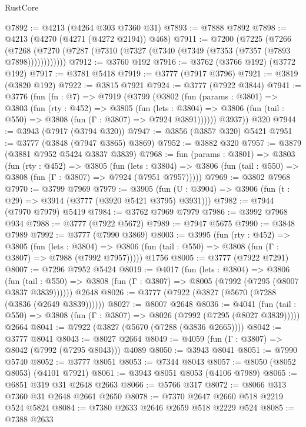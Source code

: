 \begin{lexlean}{RustCore}
\begin{coremodule}
@7892 := @4213 (@4264 @303 @7360 @31)
@7893 := @7888 @7892
@7898 := @4213 (@4270 (@4271 (@4272 @2194)) @468)
@7911 := @7200
    (@7225
      (@7266 (@7268 (@7270 (@7287 (@7310 (@7327 (@7340 (@7349 (@7353 (@7357 (@7893 @7898))))))))))))
@7912 := @3760 @192
@7916 := @3762 (@3766 @192) (@3772 @192)
@7917 := @3781 @5418
@7919 := @3777 (@7917 @3796)
@7921 := @3819 (@3820 @192)
@7922 := @3815 @7921
@7924 := @3777 (@7922 @3844)
@7941 := @3776
    (fun (fn : @7) =>
    @7919
      (@3799
        (@3802
          (fun (params : @3801) =>
          @3803
            (fun (rty : @452) =>
            @3805
              (fun (lets : @3804) =>
              @3806 (fun (tail : @550) => @3808 (fun (Γ : @3807) => @7924 @3891))))))
        @3937))
    @320
@7944 := @3943 (@7917 (@3794 @320))
@7947 := @3856 (@3857 @320) @5421
@7951 := @3777 (@3848 (@7947 @3865) @3869)
@7952 := @3882 @320
@7957 := @3879 (@3881 @7952 @5424 @3837 @3839)
@7968 := fun (params : @3801) =>
  @3803
    (fun (rty : @452) =>
    @3805
      (fun (lets : @3804) =>
      @3806 (fun (tail : @550) => @3808 (fun (Γ : @3807) => @7924 (@7951 @7957)))))
@7969 := @3802 @7968
@7970 := @3799 @7969
@7979 := @3905 (fun (U : @3904) => @3906 (fun (t : @29) => @3914 (@3777 (@3920 @5421 @3795) @3931)))
@7982 := @7944 (@7970 @7979) @5419
@7984 := @3762 @7969 @7979
@7986 := @3992 @7968 @934
@7988 := @3777 (@7922 @5672)
@7989 := @7947 @5675
@7990 := @3848 @7989
@7992 := @3777 (@7990 @3869)
@8003 := @3995
    (fun (rty : @452) =>
    @3805
      (fun (lets : @3804) =>
      @3806 (fun (tail : @550) => @3808 (fun (Γ : @3807) => @7988 (@7992 @7957)))))
    @1756
@8005 := @3777 (@7922 @7291)
@8007 := @7296 @7952 @5424
@8019 := @4017
    (fun (lets : @3804) =>
    @3806
      (fun (tail : @550) => @3808 (fun (Γ : @3807) => @8005 (@7992 (@7295 (@8007 @3837 @3839))))))
    @2648
@8026 := @3777 (@7922 (@3827 (@5670 (@7288 (@3836 (@2649 @3839))))))
@8027 := @8007 @2648
@8036 := @4041
    (fun (tail : @550) => @3808 (fun (Γ : @3807) => @8026 (@7992 (@7295 (@8027 @3839)))))
    @2664
@8041 := @7922 (@3827 (@5670 (@7288 (@3836 @2665))))
@8042 := @3777 @8041
@8043 := @8027 @2664
@8049 := @4059 (fun (Γ : @3807) => @8042 (@7992 (@7295 @8043))) @4089
@8050 := @3943 @8041
@8051 := @7990 @5740
@8052 := @3777 @8051
@8053 := @7344 @8043
@8057 := @8050 (@8052 @8053) (@4101 @7921)
@8061 := @3943 @8051 @8053 (@4106 @7989)
@8065 := @6851 @319 @31 @2648 @2663
@8066 := @5766 @317
@8072 := @8066 @313 @7360 @31 @2648 @2661 @2650
@8078 := @7370 @2647 @2660 @518 @2219 @524 @5824
@8084 := @7380 @2633 @2646 @2659 @518 @2229 @524
@8085 := @7388 @2633

\end{coremodule}
\end{lexlean}
